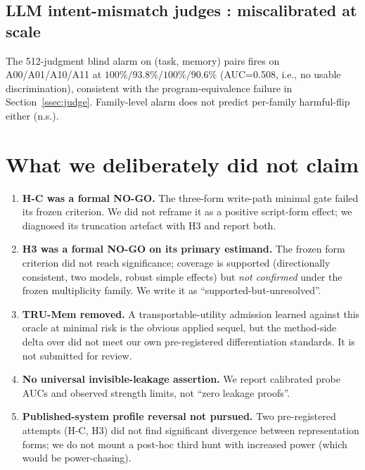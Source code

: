 \subsection{LLM intent-mismatch judges \citep{stitch2026camebench}: miscalibrated at scale}
\label{ssec:stitch}

The 512-judgment blind alarm on (task, memory) pairs fires on A00/A01/A10/A11 at $100\%/93.8\%/100\%/90.6\%$ (AUC=0.508, i.e., no usable discrimination), consistent with the program-equivalence failure in Section~\ref{ssec:judge}. Family-level alarm does not predict per-family harmful-flip either (n.s.).

\section{What we deliberately did not claim}
\label{sec:boundaries}

\begin{enumerate}[leftmargin=1.8em]
  \item \textbf{H-C was a formal NO-GO.} The three-form write-path minimal gate failed its frozen criterion. We did not reframe it as a positive script-form effect; we diagnosed its truncation artefact with H3 and report both.
  \item \textbf{H3 was a formal NO-GO on its primary estimand.} The frozen form criterion did not reach significance; coverage is supported (directionally consistent, two models, robust simple effects) but \emph{not confirmed} under the frozen multiplicity family. We write it as ``supported-but-unresolved''.
  \item \textbf{TRU-Mem removed.} A transportable-utility admission learned against this oracle at minimal risk is the obvious applied sequel, but the method-side delta over \citet{amac2026,rscbmc2026,damc2026,reme2026} did not meet our own pre-registered differentiation standards. It is not submitted for review.
  \item \textbf{No universal invisible-leakage assertion.} We report calibrated probe AUCs and observed strength limits, not ``zero leakage proofs''.
  \item \textbf{Published-system profile reversal not pursued.} Two pre-registered attempts (H-C, H3) did not find significant divergence between representation forms; we do not mount a post-hoc third hunt with increased power (which would be power-chasing).
\end{enumerate}
